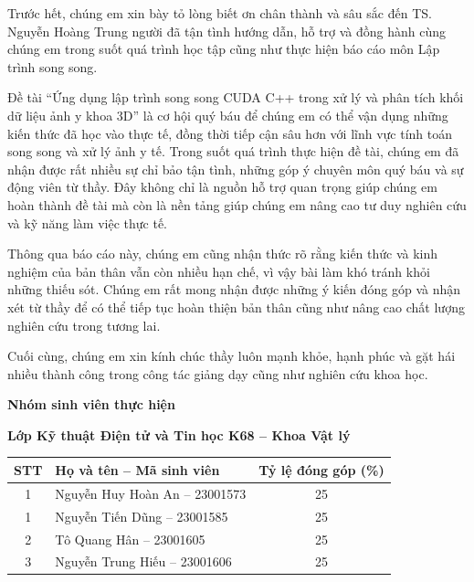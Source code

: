 \documentclass[
12pt,
oneside,
english,
doublespacing,
nolistspacing,
liststotoc,
parskip,
headsepline,
chapterinoneline,
]{HUSdissertation}
\begin{document}
\begin{acknowledgements}
	\addchaptertocentry{\acknowledgementname}
	\thispagestyle{empty}
	
	Trước hết, chúng em xin bày tỏ lòng biết ơn chân thành và sâu sắc đến TS. Nguyễn Hoàng Trung người đã tận tình hướng dẫn, hỗ trợ và đồng hành cùng chúng em trong suốt quá trình học tập cũng như thực hiện báo cáo môn Lập trình song song.

	Đề tài ``Ứng dụng lập trình song song CUDA C++ trong xử lý và phân tích khối dữ liệu ảnh y khoa 3D'' là cơ hội quý báu để chúng em có thể vận dụng những kiến thức đã học vào thực tế, đồng thời tiếp cận sâu hơn với lĩnh vực tính toán song song và xử lý ảnh y tế. Trong suốt quá trình thực hiện đề tài, chúng em đã nhận được rất nhiều sự chỉ bảo tận tình, những góp ý chuyên môn quý báu và sự động viên từ thầy. Đây không chỉ là nguồn hỗ trợ quan trọng giúp chúng em hoàn thành đề tài mà còn là nền tảng giúp chúng em nâng cao tư duy nghiên cứu và kỹ năng làm việc thực tế.

	Thông qua báo cáo này, chúng em cũng nhận thức rõ rằng kiến thức và kinh nghiệm của bản thân vẫn còn nhiều hạn chế, vì vậy bài làm khó tránh khỏi những thiếu sót. Chúng em rất mong nhận được những ý kiến đóng góp và nhận xét từ thầy để có thể tiếp tục hoàn thiện bản thân cũng như nâng cao chất lượng nghiên cứu trong tương lai.

	Cuối cùng, chúng em xin kính chúc thầy luôn mạnh khỏe, hạnh phúc và gặt hái nhiều thành công trong công tác giảng dạy cũng như nghiên cứu khoa học.

\end{acknowledgements}


\clearpage


\textbf{Nhóm sinh viên thực hiện}

\vspace{0.3cm}

\textbf{Lớp Kỹ thuật Điện tử và Tin học K68 -- Khoa Vật lý}

\vspace{0.5cm}

\begin{center}
\begin{tabular}{c l c}
\hline
\textbf{STT} & \textbf{Họ và tên -- Mã sinh viên} & \textbf{Tỷ lệ đóng góp (\%)} \\
\hline
1 & Nguyễn Huy Hoàn An -- 23001573 & 25 \\
1 & Nguyễn Tiến Dũng -- 23001585 & 25\\
2 & Tô Quang Hân -- 23001605 & 25\\
3 & Nguyễn Trung Hiếu -- 23001606 & 25\\
\hline
\end{tabular}
\end{center}
\end{document}
